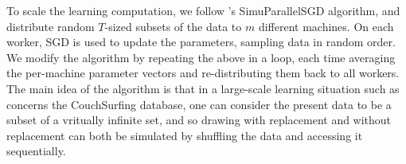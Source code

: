 To scale the learning computation, we follow \cite{Zinkevich2010}'s SimuParallelSGD algorithm, and distribute random $T$-sized subsets of the data to $m$ different machines.
On each worker, SGD is used to update the parameters, sampling data in random order.
We modify the algorithm by repeating the above in a loop, each time averaging the per-machine parameter vectors and re-distributing them back to all workers.
The main idea of the algorithm is that in a large-scale learning situation such as concerns the CouchSurfing database, one can consider the present data to be a subset of a vritually infinite set, and so drawing with replacement and without replacement can both be simulated by shuffling the data and accessing it sequentially.

%
%
%
%
%
